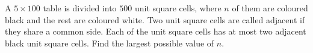 A $5 \times 100$  table is divided into $500$ unit square cells, where $n$ of them are coloured black and the rest are coloured white. Two unit square cells are called adjacent if they share a common side. Each of the unit square cells has at most two adjacent black unit square cells. Find the largest possible value of $n$.